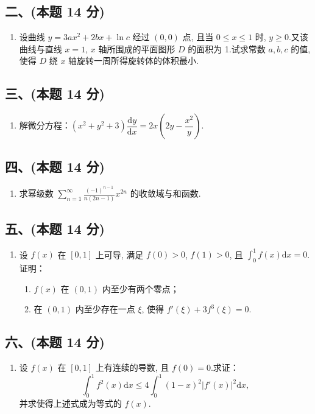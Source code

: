 \subsection*{二、(本题 14 分)}
\begin{enumerate}[start=6]
    \item 设曲线 $y = 3ax^2 + 2bx + \ln c$ 经过 $(0,0)$ 点, 且当 $0 \leq x \leq 1$ 时, $y \geq 0$.又该曲线与直线 $x = 1$, $x$ 轴所围成的平面图形 $D$ 的面积为 1.试求常数 $a, b, c$ 的值, 使得 $D$ 绕 $x$ 轴旋转一周所得旋转体的体积最小.
\end{enumerate}

\subsection*{三、(本题 14 分)}
\begin{enumerate}[start=7]
    \item 解微分方程：$(x^2 + y^2 + 3)\dfrac{\mathrm{d}y}{\mathrm{d}x} = 2x\left(2y - \dfrac{x^2}{y}\right)$.
\end{enumerate}

\subsection*{四、(本题 14 分)}
\begin{enumerate}[start=8]
    \item 求幂级数 $\displaystyle\sum_{n=1}^{\infty}\frac{(-1)^{n-1}}{n(2n-1)}x^{2n}$ 的收敛域与和函数.
\end{enumerate}

\subsection*{五、(本题 14 分)}
\begin{enumerate}[start=9]
    \item 设 $f(x)$ 在 $[0,1]$ 上可导, 满足 $f(0)>0$, $f(1)>0$, 且 $\displaystyle\int_{0}^{1}f(x)\mathrm{d}x=0$.
          证明：
          \begin{enumerate}
              \item [(1)] $f(x)$ 在 $(0,1)$ 内至少有两个零点；
              \item [(2)] 在 $(0,1)$ 内至少存在一点 $\xi$, 使得 $f'(\xi) + 3f^3(\xi) = 0$.
          \end{enumerate}
\end{enumerate}

\subsection*{六、(本题 14 分)}
\begin{enumerate}[start=10]
    \item 设 $f(x)$ 在 $[0,1]$ 上有连续的导数, 且 $f(0)=0$.求证：
          \[ \int_{0}^{1}f^2(x)\mathrm{d}x \leq 4\int_{0}^{1}(1-x)^2|f'(x)|^2\mathrm{d}x, \]
          并求使得上述式成为等式的 $f(x)$.
\end{enumerate}


